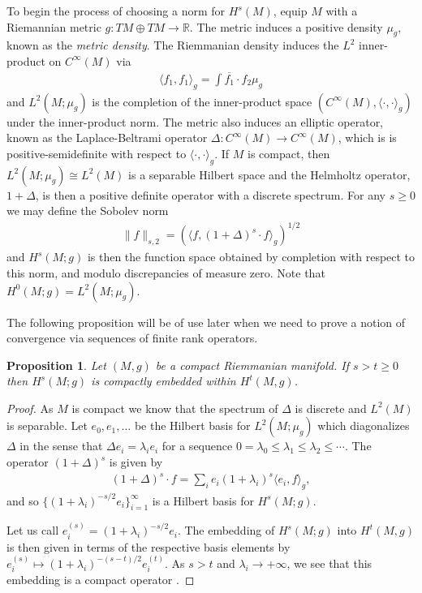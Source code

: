 \documentclass[12pt]{amsart}
\newtheorem{prop}[thm]{Proposition}
\begin{document}
To begin the process of choosing a norm for $H^{s}(M)$, equip $M$ with a Riemannian metric $g:TM \oplus TM \to \mathbb{R}$.
The metric induces a positive density $\mu_g$,
known as the \emph{metric density}. 
The Riemmanian density induces the $L^2$ inner-product on $C^\infty(M)$ via
\begin{align}
	\langle f_1 , f_1 \rangle_{g} = \int \overline{f_1} \cdot f_2 \mu_g
\end{align}
and $L^{2}(M;\mu_{g})$ is the completion of the inner-product space $( C^{\infty}(M) , \langle \cdot , \cdot \rangle_{g})$ under 
the inner-product norm.
The metric also induces an elliptic operator, known as the Laplace-Beltrami operator $\Delta: C^{\infty}(M) \to C^{\infty}(M)$, which is is positive-semidefinite
with respect to $\langle \cdot , \cdot \rangle_{g}$.
If $M$ is compact, then $L^2(M ; \mu_g) \cong L^2(M)$ is a separable Hilbert space
and the Helmholtz operator, $1 + \Delta$, is then a positive definite operator
with a discrete spectrum.
For any $s \geq 0$ we may define the Sobolev norm
\begin{align}
	\| f \|_{s,2} =  \left( \langle f , (1+\Delta)^s \cdot f \rangle_{g} \right)^{1/2}
\end{align}
and $H^s(M ; g)$ is then the function space obtained by completion with respect to this norm, and modulo discrepancies of measure zero.
Note that $H^0(M;g) = L^2(M;\mu_g)$.

The following proposition will be of use later when we need to prove a notion of convergence
via sequences of finite rank operators.

\begin{prop} \label{prop:compact_embedding}
	Let $(M,g)$ be a compact Riemmanian manifold.  If $s > t \geq 0$ then $H^s(M;g)$ is compactly embedded within $H^t(M,g)$.
\end{prop}
\begin{proof}
	As $M$ is compact we know that the spectrum of $\Delta$ is discrete and $L^{2}(M)$ is separable.
	Let $e_0, e_1,\dots$ be the Hilbert basis for $L^2(M;\mu_g)$ which diagonalizes $\Delta$
	in the sense that $\Delta e_i = \lambda_i e_i$ for a sequence $0 = \lambda_0 \leq \lambda_1 \leq \lambda_2 \leq \cdots$.
	The operator $(1+\Delta)^s$ is given by
	\begin{align}
		(1+\Delta)^s \cdot f =  \sum_{i} e_i (1+\lambda_i)^s \langle e_i , f \rangle_g,
	\end{align}
	and so $\{ (1+ \lambda_i)^{-s/2} e_i \}_{i=1}^{\infty}$ is a Hilbert basis for $H^s(M;g)$.
	
	Let us call $e_i^{(s)} = (1+ \lambda_i)^{-s/2} e_i$.
	The embedding of $H^s(M;g)$ into $H^t(M,g)$
	is then given in terms of the respective basis elements by $e_i^{(s)} \mapsto (1+\lambda_i)^{-(s-t)/2}e_i^{(t)}$.
	As $s > t$ and $\lambda_i \to +\infty$, we see that 
	this embedding is a compact operator \cite[see Proposition 4.6]{Conway1990}.
\end{proof}
\end{document}
